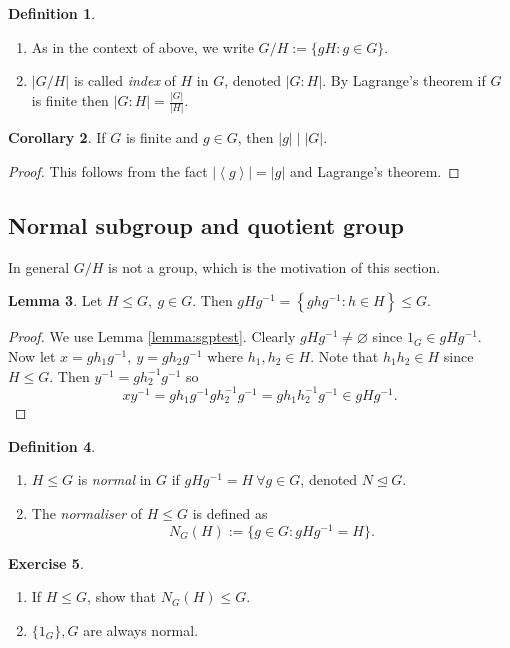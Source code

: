 \documentclass[a4paper]{article}
\newcommand{\la}{\left\langle}
\newcommand{\ra}{\right\rangle}
\theoremstyle{definition}
\newtheorem{defn}{Definition}[subsection]
\newtheorem{lemma}[defn]{Lemma}
\newtheorem{coro}[defn]{Corollary}
\newtheorem{exe}[defn]{Exercise}
\begin{document}
\begin{defn}
\begin{enumerate}
\item As in the context of above, we write $G/H:=\{gH:g\in G\}$.
\item $|G/H|$ is called \textit{index} of $H$ in $G$, denoted $|G:H|$. By Lagrange's theorem if $G$ is finite then $|G:H|=\frac{|G|}{|H|}$.
\end{enumerate}
\end{defn}
\begin{coro}
If $G$ is finite and $g\in G$, then $|g|\mid |G|$.
\end{coro}
\begin{proof}
This follows from the fact $|\la g\ra |=|g|$ and Lagrange's theorem.
\end{proof}

\subsection{Normal subgroup and quotient group}
In general $G/H$ is not a group, which is the motivation of this section.
\begin{lemma}
Let $H\leq G,\ g\in G$. Then $gHg^{-1}=\left\{ghg^{-1}:h\in H\right\} \leq G$.
\end{lemma}
\begin{proof}
We use Lemma \ref{lemma:sgptest}. Clearly $gHg^{-1}\neq \varnothing$ since $1_G\in gHg^{-1}$. Now let $x=gh_1g^{-1},\ y=gh_2g^{-1}$ where $h_1,h_2\in H$. Note that $h_1h_2\in H$ since $H\leq G$. Then $y^{-1}=gh_2^{-1}g^{-1}$ so
\[
xy^{-1}=gh_1g^{-1}gh_2^{-1}g^{-1}=gh_1h_2^{-1}g^{-1} \in gHg^{-1}.
\]
\end{proof}
\begin{defn}
\begin{enumerate}
\item $H\leq G$ is \textit{normal} in $G$ if $gHg^{-1}=H \ \forall g\in G$, denoted $N\unlhd G$.
\item The \textit{normaliser} of $H\leq G$ is defined as
\[
N_G(H):=\{g\in G:gHg^{-1}=H\}.
\]
\end{enumerate}
\end{defn}
\begin{exe}
\begin{enumerate}
\item If $H\leq G$, show that $N_G(H)\leq G$.
\item $\{1_G\},G$ are always normal.
\end{enumerate}
\end{exe}
\end{document}
